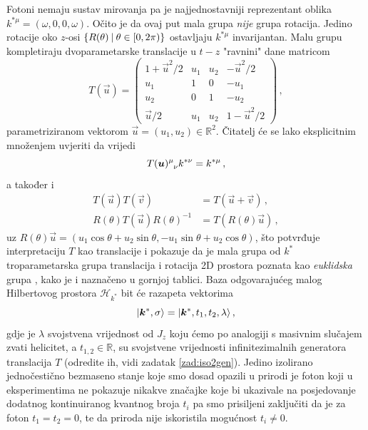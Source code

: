 Fotoni nemaju sustav mirovanja pa je najjednostavniji reprezentant
oblika $k^{*\mu} = (\omega, 0, 0, \omega)$. Očito je da ovaj put
mala grupa \emph{nije} grupa rotacija. Jedino rotacije oko $z$-osi
$\{R(\theta) \: | \: \theta \in [0, 2\pi)\}$ ostavljaju $k^{*\mu}$
invarijantan. Malu grupu kompletiraju dvoparametarske translacije
u $t-z$ "ravnini" dane matricom
\begin{equation}
  T(\vec{u}) = \begin{pmatrix}
      1+\vec{u}^2/2 & u_1 & u_2 & -\vec{u}^2/2 \\
u_1 & 1 & 0 & -u_1 \\
u_2 & 0 & 1 & -u_2 \\
\vec{u}/2 & u_1 & u_2 & 1-\vec{u}^2/2
  \end{pmatrix} \,,
    \label{eq:defTu}
\end{equation}
parametriziranom vektorom $\vec{u} = (u_1, u_2) \in \mathbb{R}^2$.
Čitatelj će se lako eksplicitnim množenjem uvjeriti da vrijedi
\begin{equation}
    \tensor{T(\vec{u})}{^{\mu}_{\nu}} k^{*\nu} = k^{*\mu} \,,
\end{equation}
a također i
\begin{align}
    T(\vec{u}) T(\vec{v}) &= T(\vec{u} + \vec{v}) \,, \\
    R(\theta) T(\vec{u}) R(\theta)^{-1} &= T(R(\theta)\vec{u}) \,,
\end{align}
uz $R(\theta)\vec{u} = (u_1\cos\theta + u_2 \sin\theta, -u_1\sin\theta+u_2\cos\theta)$,
što potvrđuje interpretaciju $T$ kao translacije i pokazuje da je mala grupa
od $k^{*}$ troparametarska grupa translacija i rotacija 2D prostora poznata
kao \emph{euklidska} grupa , kako je i naznačeno u gornjoj tablici.
Baza odgovarajućeg malog Hilbertovog prostora $\mathcal{H}_{k^*}$ bit
će razapeta vektorima
\begin{equation}
  \ket{\vec{k}^{*}, \sigma} = \ket{\vec{k}^{*}, t_1, t_{2}, \lambda} \,,
\end{equation}
gdje je $\lambda$ svojstvena vrijednost od $J_z$ koju ćemo po analogiji
s masivnim slučajem zvati helicitet, a $t_{1,2}\in\mathbb{R}$,
su svojstvene
vrijednosti infinitezimalnih generatora translacija $T$ (odredite ih, vidi
zadatak \ref{zad:iso2gen}).
Jedino izolirano jednočestično bezmaseno stanje koje smo dosad opazili
u prirodi je foton koji u eksperimentima ne pokazuje nikakve značajke
koje bi ukazivale na posjedovanje dodatnog kontinuiranog kvantnog broja
$t_i$ pa smo prisiljeni zaključiti da je za foton $t_1=t_2=0$,
te da priroda nije iskoristila mogućnost $t_i \neq 0$.
